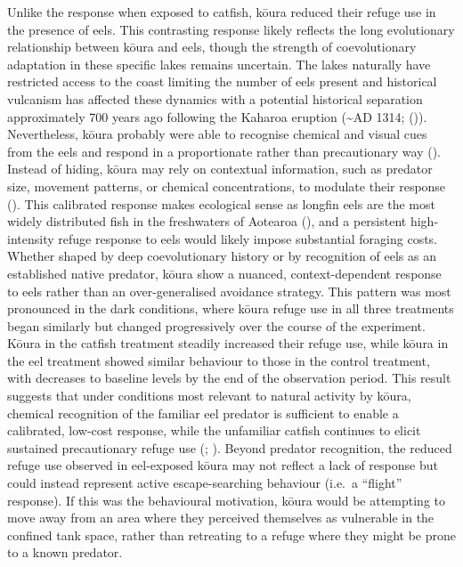 \documentclass[
  letterpaper,
  DIV=11,
  numbers=noendperiod]{scrartcl}
\begin{document}
Unlike the response when exposed to catfish, kōura reduced their refuge
use in the presence of eels. This contrasting response likely reflects
the long evolutionary relationship between kōura and eels, though the
strength of coevolutionary adaptation in these specific lakes remains
uncertain. The lakes naturally have restricted access to the coast
limiting the number of eels present and historical vulcanism has
affected these dynamics with a potential historical separation
approximately 700 years ago following the Kaharoa eruption
(\textasciitilde AD 1314; ()).
Nevertheless, kōura probably were able to recognise chemical and visual
cues from the eels and respond in a proportionate rather than
precautionary way (). Instead
of hiding, kōura may rely on contextual information, such as predator
size, movement patterns, or chemical concentrations, to modulate their
response (). This
calibrated response makes ecological sense as longfin eels are the most
widely distributed fish in the freshwaters of Aotearoa
(), and a persistent
high-intensity refuge response to eels would likely impose substantial
foraging costs. Whether shaped by deep coevolutionary history or by
recognition of eels as an established native predator, kōura show a
nuanced, context-dependent response to eels rather than an
over-generalised avoidance strategy. This pattern was most pronounced in
the dark conditions, where kōura refuge use in all three treatments
began similarly but changed progressively over the course of the
experiment. Kōura in the catfish treatment steadily increased their
refuge use, while kōura in the eel treatment showed similar behaviour to
those in the control treatment, with decreases to baseline levels by the
end of the observation period. This result suggests that under
conditions most relevant to natural activity by kōura, chemical
recognition of the familiar eel predator is sufficient to enable a
calibrated, low-cost response, while the unfamiliar catfish continues to
elicit sustained precautionary refuge use
(;
). Beyond predator
recognition, the reduced refuge use observed in eel-exposed kōura may
not reflect a lack of response but could instead represent active
escape-searching behaviour (i.e.~a ``flight'' response). If this was the
behavioural motivation, kōura would be attempting to move away from an
area where they perceived themselves as vulnerable in the confined tank
space, rather than retreating to a refuge where they might be prone to a
known predator.
\end{document}
